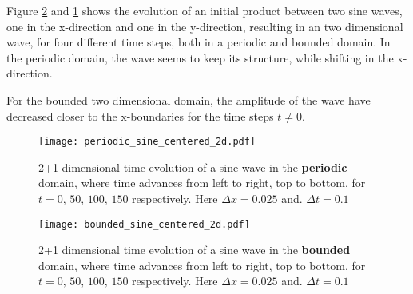 Figure \ref{fig:boundedsine2d} and \ref{fig:periodicsine2d} shows the evolution of an initial product between two sine waves, one in the x-direction and one in the y-direction, resulting in an two dimensional wave, for four different time steps, both in a periodic and bounded domain. In the periodic domain, the wave seems to keep its structure, while shifting in the x-direction.

For the bounded two dimensional domain, the amplitude of the wave have decreased closer to the x-boundaries for the time steps $t\neq 0$. 
\begin{figure}[htbp]
	\centering
	\texttt{[image: periodic\_sine\_centered\_2d.pdf]}
	\caption{2+1 dimensional time evolution of a sine wave in the \textbf{periodic} domain, where time advances from left to right, top to bottom, for $t = 0,\, 50,\, 100,\, 150$ respectively. Here $\Delta x = 0.025$ and. $\Delta t = 0.1$}
	\label{fig:periodicsine2d}
\end{figure}

\begin{figure}[htbp]
	\centering
	\texttt{[image: bounded\_sine\_centered\_2d.pdf]}
	\caption{2+1 dimensional time evolution of a sine wave in the \textbf{bounded} domain, where time advances from left to right, top to bottom, for $t = 0,\, 50,\, 100,\, 150$ respectively. Here $\Delta x = 0.025$ and. $\Delta t = 0.1$}
	\label{fig:boundedsine2d}
\end{figure}


